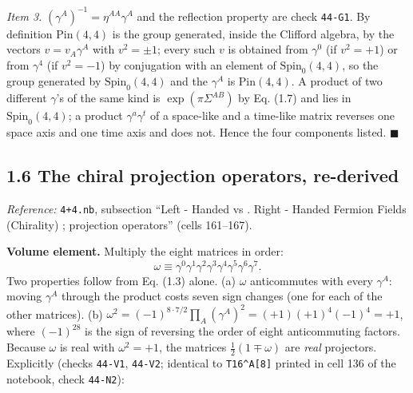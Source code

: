 \documentclass[
  10pt,
]{article}
\begin{document}
\emph{Item 3.} \((\gamma^A)^{-1}=\eta^{AA}\gamma^A\) and the reflection
property are check \texttt{44-G1}. By definition \(\mathrm{Pin}(4,4)\)
is the group generated, inside the Clifford algebra, by the vectors
\(v=v_A\gamma^A\) with \(v^2=\pm1\); every such \(v\) is obtained from
\(\gamma^0\) (if \(v^2=+1\)) or from \(\gamma^4\) (if \(v^2=-1\)) by
conjugation with an element of \(\mathrm{Spin}_0(4,4)\), so the group
generated by \(\mathrm{Spin}_0(4,4)\) and the \(\gamma^A\) is
\(\mathrm{Pin}(4,4)\). A product of two different \(\gamma\)'s of the
same kind is \(\exp(\pi\Sigma^{AB})\) by Eq. (1.7) and lies in
\(\mathrm{Spin}_0(4,4)\); a product \(\gamma^a\gamma^t\) of a space-like
and a time-like matrix reverses one space axis and one time axis and
does not. Hence the four components listed. \(\blacksquare\)

\hypertarget{the-chiral-projection-operators-re-derived}{%
\subsection{1.6 The chiral projection operators,
re-derived}\label{the-chiral-projection-operators-re-derived}}

\emph{Reference:} \texttt{4+4.nb}, subsection ``Left - Handed vs . Right
- Handed Fermion Fields (Chirality) ; projection operators'' (cells
161--167).

\textbf{Volume element.} Multiply the eight matrices in order:
\[\omega\equiv\gamma^0\gamma^1\gamma^2\gamma^3\gamma^4\gamma^5\gamma^6\gamma^7 .\]
Two properties follow from Eq. (1.3) alone. (a) \(\omega\) anticommutes
with every \(\gamma^A\): moving \(\gamma^A\) through the product costs
seven sign changes (one for each of the other matrices). (b)
\(\omega^2=(-1)^{8\cdot7/2}\prod_A(\gamma^A)^2=(+1)(+1)^4(-1)^4=+1\),
where \((-1)^{28}\) is the sign of reversing the order of eight
anticommuting factors. Because \(\omega\) is real with \(\omega^2=+1\),
the matrices \(\frac12(1\mp\omega)\) are \emph{real} projectors.
Explicitly (checks \texttt{44-V1}, \texttt{44-V2}; identical to
\texttt{T16\^{}A{[}8{]}} printed in cell 136 of the notebook, check
\texttt{44-N2}):
\end{document}
